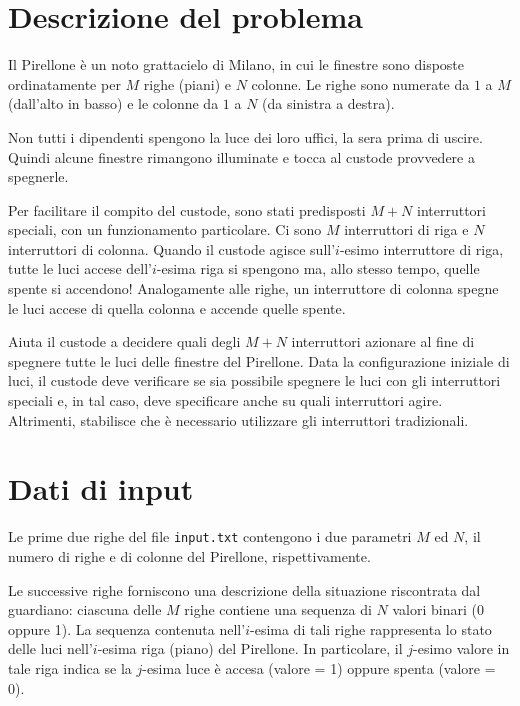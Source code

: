 \documentclass[a4paper,11pt]{article}
\begin{document}
\vspace{0.5cm}



\vspace{0.5cm}

\section*{Descrizione del problema}
  
Il Pirellone è un noto grattacielo di Milano, in cui le
finestre sono disposte ordinatamente per $M$ righe (piani) e
$N$ colonne. Le righe sono numerate da $1$ a $M$
(dall'alto in basso) e le colonne da $1$ a $N$ (da sinistra a
destra).

Non tutti i dipendenti spengono la luce dei loro uffici, la sera prima
di uscire. Quindi alcune finestre rimangono illuminate e tocca al
custode provvedere a spegnerle.

Per facilitare il compito del custode, sono stati predisposti
$M+N$ interruttori speciali, con un funzionamento
particolare.  Ci sono $M$ interruttori di riga e $N$
interruttori di colonna.  Quando il custode agisce
sull'$i$-esimo interruttore di riga, tutte le luci accese
dell'$i$-esima riga si spengono ma, allo stesso tempo, quelle
spente si accendono! Analogamente alle righe, un interruttore di
colonna spegne le luci accese di quella colonna e accende quelle
spente.

Aiuta il custode a decidere quali degli $M+N$
interruttori azionare al fine di spegnere tutte le luci delle finestre del Pirellone. Data la configurazione iniziale di luci, il custode
deve verificare se sia possibile spegnere le luci con gli interruttori
speciali e, in tal caso, deve specificare anche su quali interruttori
agire. Altrimenti, stabilisce che è necessario utilizzare gli
interruttori tradizionali.


\section*{Dati di input}
  
Le prime due righe del file \texttt{input.txt} contengono i due parametri $M$ ed $N$,
il numero di righe e di colonne del Pirellone, rispettivamente.

Le successive righe forniscono una descrizione della situazione
riscontrata dal guardiano:
ciascuna delle $M$ righe contiene una sequenza di
$N$ valori binari (0 oppure 1).  La sequenza
contenuta nell'$i$-esima di tali righe rappresenta lo stato
delle luci nell'$i$-esima riga (piano) del Pirellone. In
particolare, il $j$-esimo valore in tale riga indica se la
$j$-esima luce è accesa (valore = 1) oppure spenta
(valore = 0).
\end{document}
